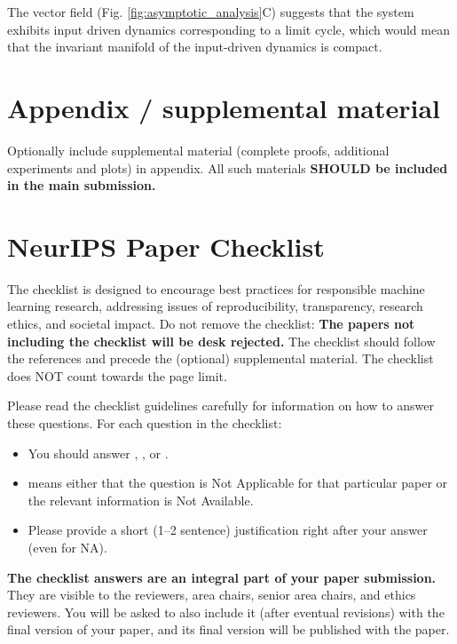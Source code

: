 \documentclass{article} %
\newcounter{ct}
\theoremstyle{definition}
\theoremstyle{remark}
\begin{document}
The vector field (Fig. \ref{fig:asymptotic_analysis}C) suggests that the system exhibits input driven dynamics  corresponding to a limit cycle, which would mean that the invariant manifold of the input-driven dynamics is compact.
%




\appendix

\section{Appendix / supplemental material}


Optionally include supplemental material (complete proofs, additional experiments and plots) in appendix.
All such materials \textbf{SHOULD be included in the main submission.}


\newpage
\section*{NeurIPS Paper Checklist}

The checklist is designed to encourage best practices for responsible machine learning research, addressing issues of reproducibility, transparency, research ethics, and societal impact. Do not remove the checklist: {\bf The papers not including the checklist will be desk rejected.} The checklist should follow the references and precede the (optional) supplemental material.  The checklist does NOT count towards the page
limit. 

Please read the checklist guidelines carefully for information on how to answer these questions. For each question in the checklist:
\begin{itemize}
    \item You should answer \answerYes{}, \answerNo{}, or \answerNA{}.
    \item \answerNA{} means either that the question is Not Applicable for that particular paper or the relevant information is Not Available.
    \item Please provide a short (1–2 sentence) justification right after your answer (even for NA). 
\end{itemize}

{\bf The checklist answers are an integral part of your paper submission.} They are visible to the reviewers, area chairs, senior area chairs, and ethics reviewers. You will be asked to also include it (after eventual revisions) with the final version of your paper, and its final version will be published with the paper.
\end{document}
